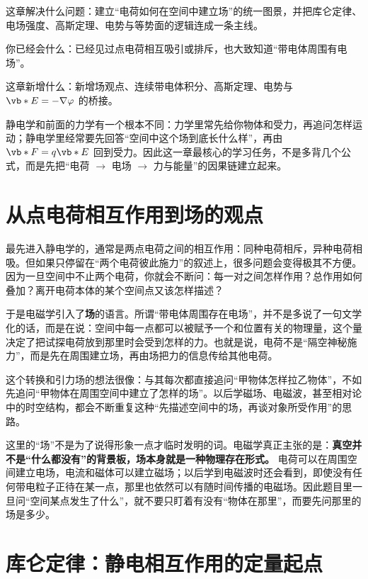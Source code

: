 \documentclass[lang=cn,11pt]{elegantbook}
\newcommand{\bridge}[1]{\begin{note}#1\end{note}}
\newcommand{\chapterroadmap}[3]{%
\begin{introduction}
 \item {\heiti 这章解决什么问题：}#1
 \item {\heiti 你已经会什么：}#2
 \item {\heiti 这章新增什么：}#3
\end{introduction}}
\begin{document}
\chapterroadmap
{建立“电荷如何在空间中建立场”的统一图景，并把库仑定律、电场强度、高斯定理、电势与等势面的逻辑连成一条主线。}
{已经见过点电荷相互吸引或排斥，也大致知道“带电体周围有电场”。}
{新增场观点、连续带电体积分、高斯定理、电势与 \(\vb*{E}=-\nabla \varphi\) 的桥接。}

\bridge{静电学和前面的力学有一个根本不同：力学里常先给你物体和受力，再追问怎样运动；静电学里经常要先回答“空间中这个场到底长什么样”，再由 \(\vb*{F}=q\vb*{E}\) 回到受力。因此这一章最核心的学习任务，不是多背几个公式，而是先把“电荷 \(\rightarrow\) 电场 \(\rightarrow\) 力与能量”的因果链建立起来。}

\section{从点电荷相互作用到场的观点}

最先进入静电学的，通常是两点电荷之间的相互作用：同种电荷相斥，异种电荷相吸。但如果只停留在“两个电荷彼此施力”的叙述上，很多问题会变得极其不方便。因为一旦空间中不止两个电荷，你就会不断问：每一对之间怎样作用？总作用如何叠加？离开电荷本体的某个空间点又该怎样描述？

于是电磁学引入了\textbf{场}的语言。所谓“带电体周围存在电场”，并不是多说了一句文学化的话，而是在说：空间中每一点都可以被赋予一个和位置有关的物理量，这个量决定了把试探电荷放到那里时会受到怎样的力。也就是说，电荷不是“隔空神秘施力”，而是先在周围建立场，再由场把力的信息传给其他电荷。

\begin{remark}
这个转换和引力场的想法很像：与其每次都直接追问“甲物体怎样拉乙物体”，不如先追问“甲物体在周围空间中建立了怎样的场”。以后学磁场、电磁波，甚至相对论中的时空结构，都会不断重复这种“先描述空间中的场，再谈对象所受作用”的思路。
\end{remark}

\begin{remark}
这里的“场”不是为了说得形象一点才临时发明的词。电磁学真正主张的是：\textbf{真空并不是“什么都没有”的背景板，场本身就是一种物理存在形式。} 电荷可以在周围空间建立电场，电流和磁体可以建立磁场；以后学到电磁波时还会看到，即使没有任何带电粒子正待在某一点，那里也依然可以有随时间传播的电磁场。因此题目里一旦问“空间某点发生了什么”，就不要只盯着有没有“物体在那里”，而要先问那里的场是多少。
\end{remark}

\section{库仑定律：静电相互作用的定量起点}
\end{document}
